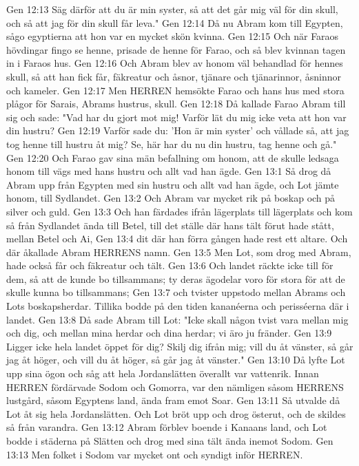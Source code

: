 Gen 12:13  Säg därför att du är min syster, så att det går mig väl för din skull, och så att jag för din skull får leva."
Gen 12:14  Då nu Abram kom till Egypten, sågo egyptierna att hon var en mycket skön kvinna.
Gen 12:15  Och när Faraos hövdingar fingo se henne, prisade de henne för Farao, och så blev kvinnan tagen in i Faraos hus.
Gen 12:16  Och Abram blev av honom väl behandlad för hennes skull, så att han fick får, fäkreatur och åsnor, tjänare och tjänarinnor, åsninnor och kameler.
Gen 12:17  Men HERREN hemsökte Farao och hans hus med stora plågor för Sarais, Abrams hustrus, skull.
Gen 12:18  Då kallade Farao Abram till sig och sade: "Vad har du gjort mot mig! Varför lät du mig icke veta att hon var din hustru?
Gen 12:19  Varför sade du: 'Hon är min syster' och vållade så, att jag tog henne till hustru åt mig? Se, här har du nu din hustru, tag henne och gå."
Gen 12:20  Och Farao gav sina män befallning om honom, att de skulle ledsaga honom till vägs med hans hustru och allt vad han ägde.
Gen 13:1  Så drog då Abram upp från Egypten med sin hustru och allt vad han ägde, och Lot jämte honom, till Sydlandet.
Gen 13:2  Och Abram var mycket rik på boskap och på silver och guld.
Gen 13:3  Och han färdades ifrån lägerplats till lägerplats och kom så från Sydlandet ända till Betel, till det ställe där hans tält förut hade stått, mellan Betel och Ai,
Gen 13:4  dit där han förra gången hade rest ett altare. Och där åkallade Abram HERRENS namn.
Gen 13:5  Men Lot, som drog med Abram, hade också får och fäkreatur och tält.
Gen 13:6  Och landet räckte icke till för dem, så att de kunde bo tillsammans; ty deras ägodelar voro för stora för att de skulle kunna bo tillsammans;
Gen 13:7  och tvister uppstodo mellan Abrams och Lots boskapsherdar. Tillika bodde på den tiden kananéerna och perisséerna där i landet.
Gen 13:8  Då sade Abram till Lot: "Icke skall någon tvist vara mellan mig och dig, och mellan mina herdar och dina herdar; vi äro ju fränder.
Gen 13:9  Ligger icke hela landet öppet för dig? Skilj dig ifrån mig; vill du åt vänster, så går jag åt höger, och vill du åt höger, så går jag åt vänster."
Gen 13:10  Då lyfte Lot upp sina ögon och såg att hela Jordanslätten överallt var vattenrik. Innan HERREN fördärvade Sodom och Gomorra, var den nämligen såsom HERRENS lustgård, såsom Egyptens land, ända fram emot Soar.
Gen 13:11  Så utvalde då Lot åt sig hela Jordanslätten. Och Lot bröt upp och drog österut, och de skildes så från varandra.
Gen 13:12  Abram förblev boende i Kanaans land, och Lot bodde i städerna på Slätten och drog med sina tält ända inemot Sodom.
Gen 13:13  Men folket i Sodom var mycket ont och syndigt inför HERREN.
